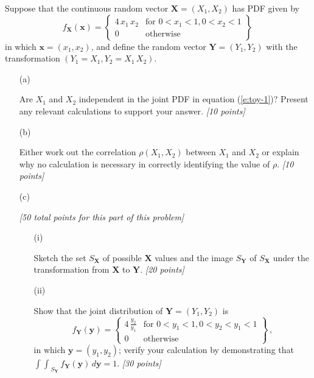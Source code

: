 \documentclass[12pt]{article}
\begin{document}
Suppose that the continuous random vector $\bm{ X } = ( X_1, X_2 )$ has PDF given by
\begin{equation} \label{e:toy-1}
f_{ \bm{ X } } ( \bm{ x } ) = \left\{ \begin{array}{cc} 4 \, x_1 \, x_2 & \text{for } 0 < x_1 < 1, 0 < x_2 < 1 \\ 0 & \text{otherwise} \end{array} \right\} \,
\end{equation}
in which $\bm{ x } = ( x_1, x_2 )$, and define the random vector $\bm{ Y } = ( Y_1, Y_2 )$ with the transformation $( Y_1 = X_1, Y_2 = X_1 \, X_2 )$.

\begin{itemize}

\item[(a)]

Are $X_1$ and $X_2$ independent in the joint PDF in equation (\ref{e:toy-1})? Present any relevant calculations to support your answer. \textit{[10 points]}

\item[(b)]

Either work out the correlation $\rho ( X_1, X_2 )$ between $X_1$ and $X_2$ or explain why no calculation is necessary in correctly identifying the value of $\rho$. \textit{[10 points]}

\item[(c)]

\textit{[50 total points for this part of this problem]}

\begin{itemize}

\item[(i)]

Sketch the set $S_{ \bm{ X } }$ of possible $\bm{ X }$ values and the image $S_{ \bm{ Y } }$ of $S_{ \bm{ X } }$ under the transformation from $\bm{ X }$ to $\bm{ Y }$.  \textit{[20 points]}

\item[(ii)]

Show that the joint distribution of $\bm{ Y } = ( Y_1, Y_2 )$ is
\begin{equation} \label{e:toy-2}
f_{ \bm{ Y } } ( \bm{ y } ) = \left\{ \begin{array}{cc} 4 \, \frac{ y_2 }{ y_1 } & \text{for } 0 < y_1 < 1, 0 < y_2 < y_1 < 1 \\ 0 & \text{otherwise} \end{array} \right\} \, ,
\end{equation}
in which $\bm{ y } = ( y_1, y_2 )$; verify your calculation by demonstrating that ${\int \! \! \int}_{ S_{ \bm{ Y } } } \, f_{ \bm{ Y } } ( \bm{ y } ) \, d \bm{ y } = 1$. \textit{[30 points]}


\end{itemize}
\end{itemize}
\end{document}
